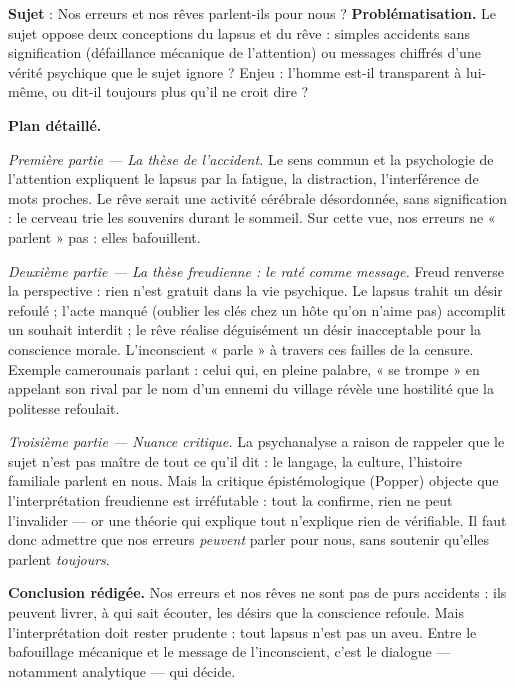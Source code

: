 \documentclass[11pt]{article}
\begin{document}
\begin{exoresolu}
\textbf{Sujet} : Nos erreurs et nos rêves parlent-ils pour nous ?
\tcblower
\textbf{Problématisation.} Le sujet oppose deux conceptions du lapsus et du rêve : simples accidents sans signification (défaillance mécanique de l'attention) ou messages chiffrés d'une vérité psychique que le sujet ignore ? Enjeu : l'homme est-il transparent à lui-même, ou dit-il toujours plus qu'il ne croit dire ?

\textbf{Plan détaillé.}

\emph{Première partie — La thèse de l'accident.} Le sens commun et la psychologie de l'attention expliquent le lapsus par la fatigue, la distraction, l'interférence de mots proches. Le rêve serait une activité cérébrale désordonnée, sans signification : le cerveau trie les souvenirs durant le sommeil. Sur cette vue, nos erreurs ne « parlent » pas : elles bafouillent.

\emph{Deuxième partie — La thèse freudienne : le raté comme message.} Freud renverse la perspective : rien n'est gratuit dans la vie psychique. Le lapsus trahit un désir refoulé ; l'acte manqué (oublier les clés chez un hôte qu'on n'aime pas) accomplit un souhait interdit ; le rêve réalise déguisément un désir inacceptable pour la conscience morale. L'inconscient « parle » à travers ces failles de la censure. Exemple camerounais parlant : celui qui, en pleine palabre, « se trompe » en appelant son rival par le nom d'un ennemi du village révèle une hostilité que la politesse refoulait.

\emph{Troisième partie — Nuance critique.} La psychanalyse a raison de rappeler que le sujet n'est pas maître de tout ce qu'il dit : le langage, la culture, l'histoire familiale parlent en nous. Mais la critique épistémologique (Popper) objecte que l'interprétation freudienne est irréfutable : tout la confirme, rien ne peut l'invalider — or une théorie qui explique tout n'explique rien de vérifiable. Il faut donc admettre que nos erreurs \emph{peuvent} parler pour nous, sans soutenir qu'elles parlent \emph{toujours}.

\textbf{Conclusion rédigée.} Nos erreurs et nos rêves ne sont pas de purs accidents : ils peuvent livrer, à qui sait écouter, les désirs que la conscience refoule. Mais l'interprétation doit rester prudente : tout lapsus n'est pas un aveu. Entre le bafouillage mécanique et le message de l'inconscient, c'est le dialogue — notamment analytique — qui décide.
\end{exoresolu}
\end{document}
